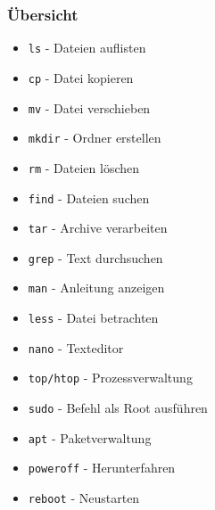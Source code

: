 \documentclass[12pt,utf8]{beamer}
\begin{document}
\begin{frame}
\frametitle{Übersicht}
\small
\begin{minipage}{0.48\linewidth}
	\begin{itemize}
		\item \texttt{ls} - Dateien auflisten
		\item \texttt{cp} - Datei kopieren
		\item \texttt{mv} - Datei verschieben
		\item \texttt{mkdir} - Ordner erstellen
		\item \texttt{rm} - Dateien löschen
		\item \texttt{find} - Dateien suchen
		\item \texttt{tar} - Archive verarbeiten
		\item \texttt{grep} - Text durchsuchen
		\item \texttt{man} - Anleitung anzeigen
	\end{itemize}
\end{minipage}
\begin{minipage}{0.48\linewidth}
	\begin{itemize}
		\item \texttt{less} - Datei betrachten
		\item \texttt{nano} - Texteditor
		\item \texttt{top/htop} - Prozessverwaltung
		\item \texttt{sudo} - Befehl als Root ausführen
		\item \texttt{apt} - Paketverwaltung
		\item \texttt{poweroff} - Herunterfahren
		\item \texttt{reboot} - Neustarten
	\end{itemize}
\end{minipage}

\end{frame}
\end{document}
